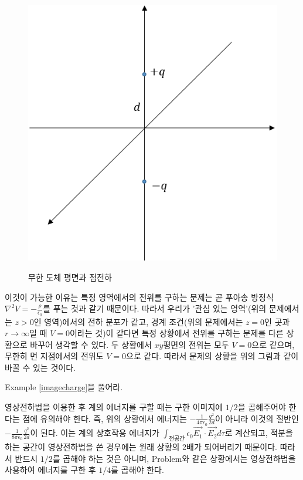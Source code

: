 \begin{figure}[h]
\centering\includegraphics[scale=0.5]{Pictures/image_charge-2.PNG}
\label{fig: imagecharge2}
\caption{무한 도체 평면과 점전하}
\end{figure}
이것이 가능한 이유는 특정 영역에서의 전위를 구하는 문제는 곧 푸아송 방정식 $\nabla^2 V = -\frac{\rho}{\epsilon_0}$를 푸는 것과 같기 때문이다. 따라서 우리가 '관심 있는 영역'(위의 문제에서는 $z>0$인 영역)에서의 전하 분포가 같고, 경계 조건(위의 문제에서는 $z=0$인 곳과 $r\to\infty$일 때 $V=0$이라는 것)이 같다면 특정 상황에서 전위를 구하는 문제를 다른 상황으로 바꾸어 생각할 수 있다. 두 상황에서 $xy$평면의 전위는 모두 $V=0$으로 같으며, 무한히 먼 지점에서의 전위도 $V=0$으로 같다. 따라서 문제의 상황을 위의 그림과 같이 바꿀 수 있는 것이다. \\
\begin{exercise}
Example \ref{imagecharge}을 풀어라.
\end{exercise}
영상전하법을 이용한 후 계의 에너지를 구할 때는 구한 이미지에 $1/2$을 곱해주어야 한다는 점에 유의해야 한다. 즉, 위의 상황에서 에너지는 $-\frac{1}{4\pi\epsilon_0}\frac{q^2}{2d}$이 아니라 이것의 절반인 $-\frac{1}{8\pi\epsilon_0}\frac{q^2}{2d}$이 된다. 이는 계의 상호작용 에너지가 $\int_{전 공간} \epsilon_0\vec{E_1}\cdot\vec{E_2} d\tau$로 계산되고, 적분을 하는 공간이 영상전하법을 쓴 경우에는 원래 상황의 2배가 되어버리기 때문이다. 따라서 반드시 $1/2$를 곱해야 하는 것은 아니며, Problem\label{image_charge_4}와 같은 상황에서는 영상전하법을 사용하여 에너지를 구한 후 $1/4$를 곱해야 한다.
